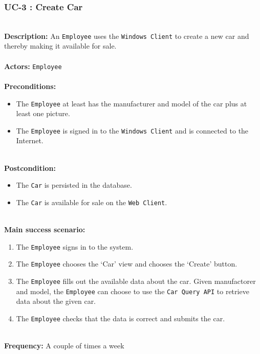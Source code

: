 \subsubsection{UC-3 : Create Car}
\label{create-car-use-case}
\HRule \\[0.4cm]
\textbf{Description:} An \texttt{Employee} uses the \texttt{Windows Client} to create a new car and thereby making it available for sale. \\
\HRule \\[0.4cm]
\textbf{Actors:} \texttt{Employee}\\
\HRule \\[0.4cm]
\textbf{Preconditions:} 
\begin{itemize}
    \item The \texttt{Employee} at least has the manufacturer and model of the car plus at least one picture.
    \item The \texttt{Employee} is signed in to the \texttt{Windows Client} and is connected to the Internet.
\end{itemize}
\HRule \\[0.4cm]
\textbf{Postcondition:}
\begin{itemize}
    \item The \texttt{Car} is persisted in the database.
    \item The \texttt{Car} is available for sale on the \texttt{Web Client}.
\end{itemize}
\HRule \\[0.4cm]
\textbf{Main success scenario:}
\begin{enumerate}
    \item The \texttt{Employee} signs in to the system.
    \item The \texttt{Employee} chooses the `Car' view and chooses the `Create' button.
    \item The \texttt{Employee} fills out the available data about the car. Given manufactorer and model, the \texttt{Employee} can choose to use the \texttt{Car Query API} to retrieve data about the given car.
    \item The \texttt{Employee} checks that the data is correct and submits the car.
\end{enumerate}
\HRule \\[0.4cm]
\textbf{Frequency:}
A couple of times a week \\
\HRule \\[0.4cm]

